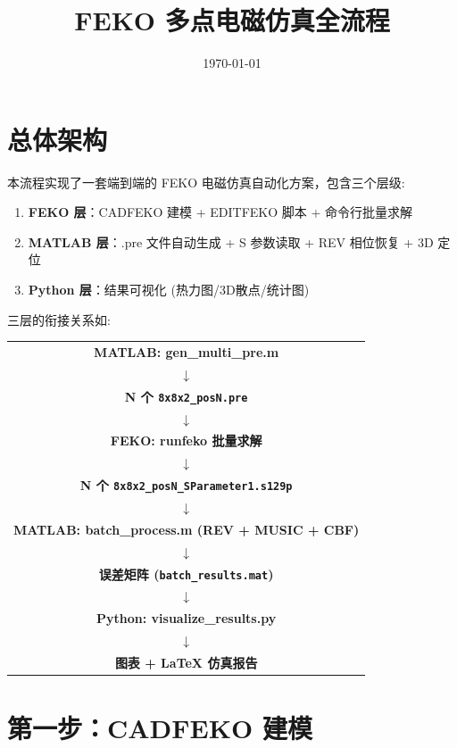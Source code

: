 \documentclass[12pt,a4paper]{ctexart}
\title{\textbf{FEKO 多点电磁仿真全流程}}
\author{}
\date{\today}
\begin{document}
\maketitle

\section{总体架构}

本流程实现了一套端到端的 FEKO 电磁仿真自动化方案，包含三个层级:

\begin{enumerate}[itemsep=4pt]
    \item \textbf{FEKO 层}：CADFEKO 建模 + EDITFEKO 脚本 + 命令行批量求解
    \item \textbf{MATLAB 层}：.pre 文件自动生成 + S 参数读取 + REV 相位恢复 + 3D 定位
    \item \textbf{Python 层}：结果可视化 (热力图/3D散点/统计图)
\end{enumerate}

三层的衔接关系如:

\begin{center}
\begin{tabular}{c}
\textbf{MATLAB: gen\_multi\_pre.m} \\
$\downarrow$ \\
\textbf{N 个 \texttt{8x8x2\_posN.pre}} \\
$\downarrow$ \\
\textbf{FEKO: runfeko 批量求解} \\
$\downarrow$ \\
\textbf{N 个 \texttt{8x8x2\_posN\_SParameter1.s129p}} \\
$\downarrow$ \\
\textbf{MATLAB: batch\_process.m (REV + MUSIC + CBF)} \\
$\downarrow$ \\
\textbf{误差矩阵 (\texttt{batch\_results.mat})} \\
$\downarrow$ \\
\textbf{Python: visualize\_results.py} \\
$\downarrow$ \\
\textbf{图表 + LaTeX 仿真报告}
\end{tabular}
\end{center}

\section{第一步：CADFEKO 建模}
\end{document}
